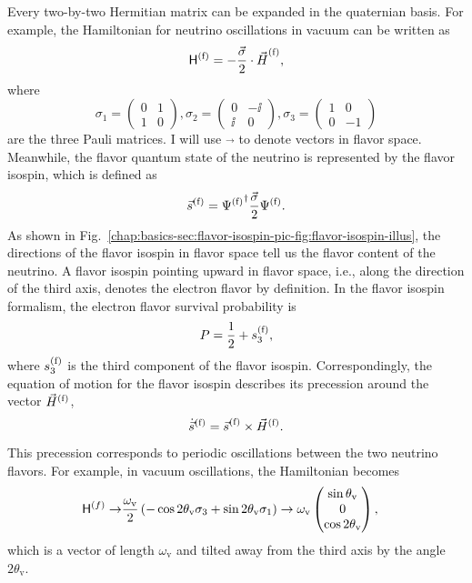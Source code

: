 Every two-by-two Hermitian matrix can be expanded in the quaternian basis. For example, the Hamiltonian for neutrino oscillations in vacuum can be written as
\begin{equation}
\mathsf H^{(\mathrm f)} = - \frac{\vec{\sigma} }{2}\cdot {\vec{H}}^{(\mathrm f)},
\end{equation}
where
\begin{equation}
\sigma_1 =  \begin{pmatrix}
0 & 1 \\
1 & 0
\end{pmatrix}, \sigma_2 =  \begin{pmatrix}
0 & -\ii \\
\ii & 0
\end{pmatrix},  \sigma_3 =  \begin{pmatrix}
1 & 0 \\
0 & -1
\end{pmatrix}
\end{equation}
are the three Pauli matrices. I will use $\vec{}$ to denote vectors in flavor space.
Meanwhile, the flavor quantum state of the neutrino is represented by the flavor isospin, which is defined as
\begin{equation}
    \vec s^{(\mathrm f)} = {\Psi^{(\mathrm f)}}^{\dagger} \frac{\vec{\sigma} }{2} \Psi^{(\mathrm f)}.
\end{equation}
As shown in Fig.~\ref{chap:basics-sec:flavor-isospin-pic-fig:flavor-isospin-illus}, the directions of the flavor isospin in flavor space tell us the flavor content of the neutrino. A flavor isospin pointing upward in flavor space, i.e., along the direction of the third axis, denotes the electron flavor by definition. In the flavor isospin formalism, the electron flavor survival probability is
\begin{equation*}
P = \frac{1}{2} + s^{{(\ff)}}_3,
\label{chap:basics-sec:flavor-isospin-pic-eqn:probability-flavor}
\end{equation*}
where $s^{(\mathrm f)}_3$ is the third component of the flavor isospin.
Correspondingly, the equation of motion for the flavor isospin describes its precession around the vector $\vec{H}^{(\mathrm f)}$,
\begin{equation}
\dot{\vec{s}}^{(\ff)} = {\vec{s}}^{(\ff)} \times \vec{H}^{(\ff)}.
\label{chap:basics-sec:flavor-isospin-pic-eqn:eom-precession}
\end{equation}
This precession corresponds to periodic oscillations between the two neutrino flavors. For example, in vacuum oscillations, the Hamiltonian becomes
\begin{align*}
{\mathsf H}^{(f)} \to &\frac{\omega_{\mathrm v} }{2}\left( - \cos 2\theta_{\mathrm v } \sigma_3  + \sin 2\theta_{\mathrm{v}} \sigma_1 \right)
\to  \omega_\mathrm v\begin{pmatrix}
 \sin \theta_\mathrm v\\
0\\
\cos 2\theta_{\mathrm v}
\end{pmatrix},
\end{align*}
which is a vector of length $\omega_{\mathrm v}$ and tilted away from the third axis by the angle $2\theta_{\mathrm v}$.

